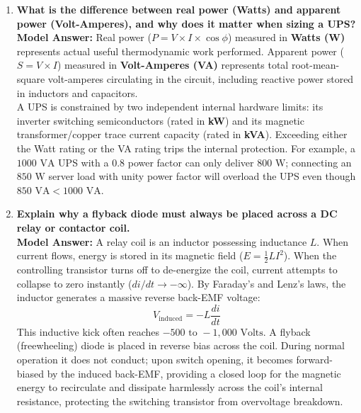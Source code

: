 \begin{enumerate}[leftmargin=*,label=\textbf{Q\arabic*.}]
    \item \textbf{What is the difference between real power (Watts) and apparent power (Volt-Amperes), and why does it matter when sizing a UPS?} \\
    \textbf{Model Answer:} Real power ($P = V \times I \times \cos\phi$) measured in \textbf{Watts (W)} represents actual useful thermodynamic work performed. Apparent power ($S = V \times I$) measured in \textbf{Volt-Amperes (VA)} represents total root-mean-square volt-amperes circulating in the circuit, including reactive power stored in inductors and capacitors. \\
    A UPS is constrained by two independent internal hardware limits: its inverter switching semiconductors (rated in \textbf{kW}) and its magnetic transformer/copper trace current capacity (rated in \textbf{kVA}). Exceeding either the Watt rating or the VA rating trips the internal protection. For example, a $1000\text{ VA}$ UPS with a $0.8$ power factor can only deliver $800\text{ W}$; connecting an $850\text{ W}$ server load with unity power factor will overload the UPS even though $850\text{ VA} < 1000\text{ VA}$.

    \item \textbf{Explain why a flyback diode must always be placed across a DC relay or contactor coil.} \\
    \textbf{Model Answer:} A relay coil is an inductor possessing inductance $L$. When current flows, energy is stored in its magnetic field ($E = \frac{1}{2} L I^2$). When the controlling transistor turns off to de-energize the coil, current attempts to collapse to zero instantly ($di/dt \to -\infty$). By Faraday's and Lenz's laws, the inductor generates a massive reverse back-EMF voltage:
    \[
    V_{\text{induced}} = -L \frac{di}{dt}
    \]
    This inductive kick often reaches $-500\text{ to }-1,000\text{ Volts}$. A flyback (freewheeling) diode is placed in reverse bias across the coil. During normal operation it does not conduct; upon switch opening, it becomes forward-biased by the induced back-EMF, providing a closed loop for the magnetic energy to recirculate and dissipate harmlessly across the coil's internal resistance, protecting the switching transistor from overvoltage breakdown.


\end{enumerate}
